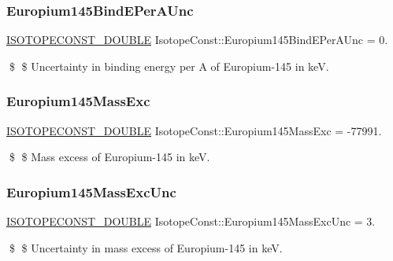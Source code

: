 \subsubsection{\texorpdfstring{Europium145\+Bind\+E\+Per\+A\+Unc}{Europium145BindEPerAUnc}}
{\footnotesize\ttfamily \mbox{\hyperlink{group___isotope_const-_macros_ga8f45a7272ce02c0b4c65c44636ed719a}{I\+S\+O\+T\+O\+P\+E\+C\+O\+N\+S\+T\+\_\+\+D\+O\+U\+B\+LE}} Isotope\+Const\+::\+Europium145\+Bind\+E\+Per\+A\+Unc = 0.}

\$ \$ Uncertainty in binding energy per A of Europium-\/145 in keV. \mbox{\label{group___isotope_const-_europium-_eu145_ga6226afeb97c4c2869af0a4d3ed588625}} 
\subsubsection{\texorpdfstring{Europium145\+Mass\+Exc}{Europium145MassExc}}
{\footnotesize\ttfamily \mbox{\hyperlink{group___isotope_const-_macros_ga8f45a7272ce02c0b4c65c44636ed719a}{I\+S\+O\+T\+O\+P\+E\+C\+O\+N\+S\+T\+\_\+\+D\+O\+U\+B\+LE}} Isotope\+Const\+::\+Europium145\+Mass\+Exc = -\/77991.}

\$ \$ Mass excess of Europium-\/145 in keV. \mbox{\label{group___isotope_const-_europium-_eu145_gacca802d8600b30f0b5a3017bcbc5d5e6}} 
\subsubsection{\texorpdfstring{Europium145\+Mass\+Exc\+Unc}{Europium145MassExcUnc}}
{\footnotesize\ttfamily \mbox{\hyperlink{group___isotope_const-_macros_ga8f45a7272ce02c0b4c65c44636ed719a}{I\+S\+O\+T\+O\+P\+E\+C\+O\+N\+S\+T\+\_\+\+D\+O\+U\+B\+LE}} Isotope\+Const\+::\+Europium145\+Mass\+Exc\+Unc = 3.}

\$ \$ Uncertainty in mass excess of Europium-\/145 in keV. \mbox{\label{group___isotope_const-_europium-_eu145_ga735f26a6a1898f824bae6a516e99b869}} 

